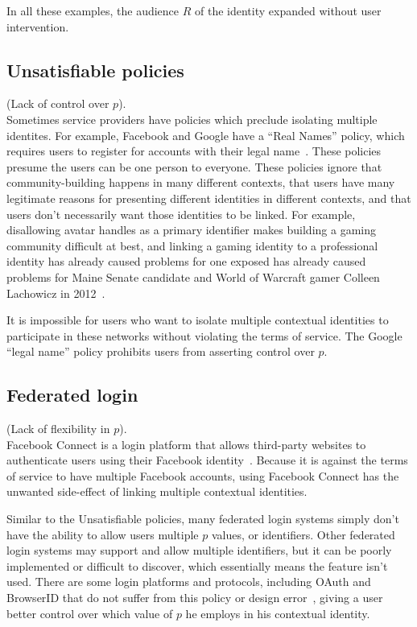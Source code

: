 \documentclass{llncs}
\begin{document}
In all these examples, the audience $R$ of the identity expanded without user
intervention.

\subsection{Unsatisfiable policies}
(Lack of control over $p$).\\
Sometimes service providers have policies which preclude isolating multiple
identites. For example, Facebook and Google have a ``Real Names'' policy, which
requires users to register for accounts with their legal
name~\cite{fb_names,google_names}.  These policies presume the users can be one
person to everyone. These policies ignore that community-building happens in
many different contexts, that users have many legitimate reasons for presenting
different identities in different contexts, and that users don't necessarily
want those identities to be linked. For example, disallowing avatar handles as
a primary identifier makes building a gaming community difficult at best, and
linking a gaming identity to a professional identity has already caused
problems for one exposed has already caused problems for Maine Senate candidate
and World of Warcraft gamer Colleen Lachowicz in 2012~\cite{maine}.

It is impossible for users who want to isolate multiple contextual identities
to participate in these networks without violating the terms of service.  The
Google ``legal name'' policy prohibits users from asserting control over $p$.

\subsection{Federated login}
(Lack of flexibility in $p$).\\
Facebook Connect is a login platform that allows third-party websites to
authenticate users using their Facebook identity~\cite{fb_connect}. Because it
is against the terms of service to have multiple Facebook accounts, using
Facebook Connect has the unwanted side-effect of linking multiple contextual
identities.

Similar to the Unsatisfiable policies, many federated login systems simply
don't have the ability to allow users multiple $p$ values, or identifiers.
Other federated login systems may support and allow multiple identifiers, but
it can be poorly implemented or difficult to discover, which essentially means
the feature isn't used.
There are some login platforms and protocols, including OAuth and BrowserID
that do not suffer from this policy or design error~\cite{browserid,oauth},
giving a user better control over which value of $p$ he employs in his
contextual identity.
\begin{comment} (TODO:
this is actually kinda complicated -- yahoo, twitter, google allow multiple
accounts but the multi-login support is broken at google, not sure how it is
with others, oauth protocol supports multiple accounts, persona clearly
supports multiple accounts)
\end{comment}
\end{document}
